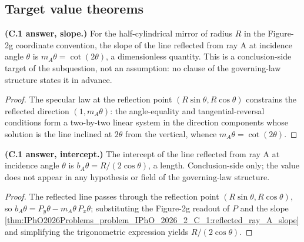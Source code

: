 \subsection*{Target value theorems}

\begin{theorem}
\label{thm:IPhO2026Problems_problem_IPhO_2026_2_C_1:reflected_ray_A_slope}
\textbf{(C.1 answer, slope.)}  For the half-cylindrical mirror of
radius $R$ in the Figure-2g coordinate convention, the slope of the line
reflected from ray A at incidence angle $\theta$ is
$m_A\theta = \cot(2\theta)$, a dimensionless quantity.  This is a
conclusion-side target of the subquestion, not an assumption: no clause
of the governing-law structure states it in advance.
\end{theorem}
\begin{proof}
The specular law at the reflection point
$(R\sin\theta, R\cos\theta)$ constrains the reflected direction
$(1, m_A\theta)$: the angle-equality and tangential-reversal conditions
form a two-by-two linear system in the direction components whose
solution is the line inclined at $2\theta$ from the vertical, whence
$m_A\theta = \cot(2\theta)$.
\end{proof}

\begin{theorem}
\label{thm:IPhO2026Problems_problem_IPhO_2026_2_C_1:reflected_ray_A_intercept}
\textbf{(C.1 answer, intercept.)}  The intercept of the line reflected
from ray A at incidence angle $\theta$ is
$b_A\theta = R/(2\cos\theta)$, a length.  Conclusion-side only; the
value does not appear in any hypothesis or field of the governing-law
structure.
\end{theorem}
\begin{proof}
The reflected line passes through the reflection point
$(R\sin\theta, R\cos\theta)$, so
$b_A\theta = P_y\theta - m_A\theta\,P_x\theta$; substituting the
Figure-2g readout of $P$ and the slope
\cref{thm:IPhO2026Problems_problem_IPhO_2026_2_C_1:reflected_ray_A_slope}
and simplifying the trigonometric expression yields
$R/(2\cos\theta)$.
\end{proof}

